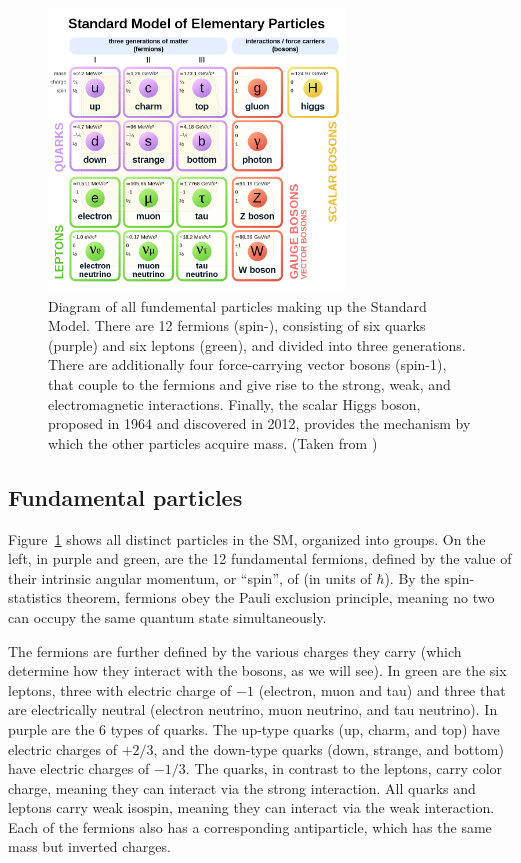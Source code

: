\begin{figure}[ht]
  \begin{center}
    \includegraphics[width=0.70\textwidth]{figs/theory/standard_model.png}
    \caption{Diagram of all fundemental particles making up the Standard Model. There are 12 fermions (spin-), 
      consisting of six quarks (purple) and six leptons (green), 
      and divided into three generations. There are additionally four force-carrying vector bosons (spin-1),
      that couple to the fermions and give rise to the strong, weak, and electromagnetic interactions.
      Finally, the scalar Higgs boson, proposed in 1964 and discovered in 2012, provides the mechanism
      by which the other particles acquire mass. (Taken from \cite{SM_diagram})
            }
    \label{fig:sm}
  \end{center}
\end{figure}

\subsection{Fundamental particles}

Figure~\ref{fig:sm} shows all distinct particles in the SM, organized into groups.
On the left, in purple and green, are the 12 fundamental fermions, defined by the
value of their intrinsic angular momentum, or ``spin'', of  (in units
of $\hbar$). By the spin-statistics theorem, fermions obey the Pauli exclusion principle,
meaning no two can occupy the same quantum state simultaneously.

The fermions are further defined by the various charges they carry (which determine how they
interact with the bosons, as we will see). In green are the six leptons, three with electric charge
of $-1$ (electron, muon and tau) and three that are electrically neutral (electron neutrino, muon
neutrino, and tau neutrino). In purple are the 6 types of quarks. The up-type quarks (up, charm, and top)
have electric charges of $+2/3$, and the down-type quarks (down, strange, and bottom) have electric
charges of $-1/3$. The quarks, in contrast to the leptons, carry color charge, meaning they
can interact via the strong interaction. All quarks and leptons carry weak isospin, meaning they can interact
via the weak interaction. Each of the fermions also has a corresponding antiparticle, which has the same
mass but inverted charges.

